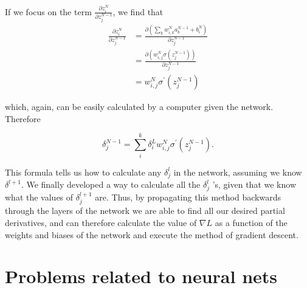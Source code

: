 If we focus on the term $\frac{\partial z^N_i}{\partial z^{N - 1}_j}$, we find that
\begin{align*}
  \frac{\partial z^N_i}{\partial z^{N - 1}_j} & = \frac{\partial (\sum_k w^N_{i, k} a^{N - 1}_k + b^N_i)}{\partial z^{N - 1}_j} \\
                &= \frac{\partial (w^N_{i, j} \sigma (z^{N - 1}_j))}{\partial z^{N - 1}_j} \\
                &= w^N_{i, j} \sigma^{\prime} (z^{N - 1}_j)
\end{align*}

which, again, can be easily calculated by a computer given the network. Therefore

\begin{equation}
  \delta^{N - 1}_j = \sum_i^k \delta^L_i w^N_{i, j} \sigma^{\prime} (z^{N - 1}_j).
\end{equation}

This formula tells us how to calculate any $\delta^l_j$ in the network, assuming we know $\delta^{l+1}$. We finally developed a way to
calculate all the $\delta^l_j$ ’s, given that we know what the values of $\delta^{l + 1}_j$  are. Thus, by propagating this method backwards through the layers of the network we are able to find all our desired partial derivatives, and can therefore calculate the value of $\nabla L$ as a function of the weights and biases of the network and execute the method of gradient descent.

\section{Problems related to neural nets}

